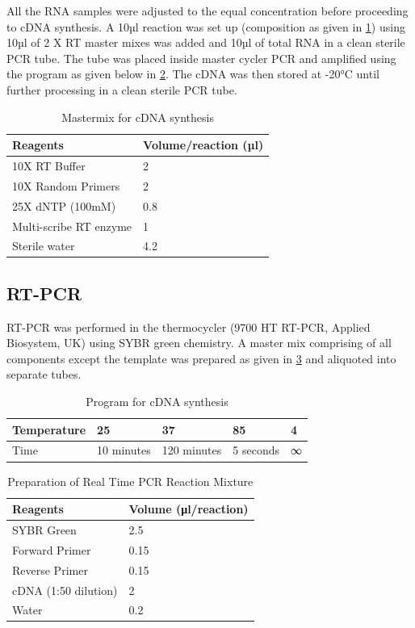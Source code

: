 \begin{refsection}
All the RNA samples were adjusted to the equal concentration before proceeding to cDNA synthesis. A 10µl reaction was set up (composition as given in \cref{tab:2.4cdnamm}) using 10µl of 2 X RT master mixes was added and 10µl of total RNA in a clean sterile PCR tube. The tube was placed inside master cycler PCR and amplified using the program as given below in \cref{tab:2.5cdnaprog}. The cDNA was then stored at -20°C until further processing in a clean sterile PCR tube. 

\begin{table}[!tb]
\centering
\caption{Mastermix for cDNA synthesis}
\label{tab:2.4cdnamm}
\begin{tabular}{  l  l  }
\hline
	Reagents & Volume/reaction (µl) \\ \hline
	10X RT Buffer & 2 \\ \hline
	10X Random Primers & 2 \\ \hline
	25X dNTP (100mM) & 0.8 \\ \hline
	Multi-scribe RT enzyme & 1 \\ \hline
	Sterile water & 4.2 \\ \hline
\end{tabular}
\end{table}



\subsection{RT-PCR}
RT-PCR was performed in the thermocycler (9700 HT RT-PCR, Applied Biosystem, UK) using SYBR green chemistry. A master mix comprising of all components except the template was prepared as given in \cref{tab:2.6rtmm} and aliquoted into separate tubes. 

\begin{table}[!tb]
\centering
\caption{Program for cDNA synthesis}
\label{tab:2.5cdnaprog}
\begin{tabular}{  l  l  l  l  l  }
\hline
	Temperature & 25 & 37 & 85 & 4 \\ \hline
	Time & 10 minutes & 120 minutes & 5 seconds & ∞ \\ \hline
\end{tabular}
\end{table}

\begin{table}[!h]
\centering
\caption{Preparation of Real Time PCR Reaction Mixture}
\label{tab:2.6rtmm}
\begin{tabular}{  l  l  }
\hline
	Reagents & Volume (μl/reaction) \\ \hline
	SYBR Green & 2.5 \\ \hline
	Forward Primer & 0.15 \\ \hline
	Reverse Primer & 0.15 \\ \hline
	cDNA (1:50 dilution) & 2 \\ \hline
	Water & 0.2 \\ \hline
\end{tabular}
\end{table}


\end{refsection}
